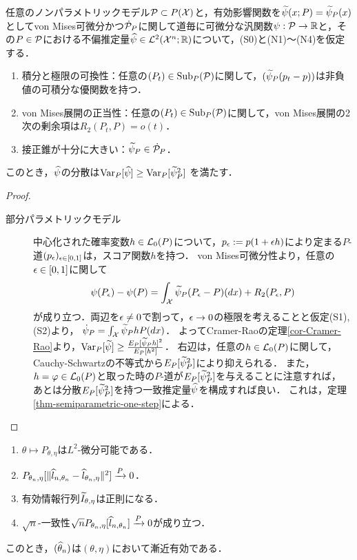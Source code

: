 \documentclass[uplatex, dvipdfmx]{jsarticle}
\newcommand{\Sub}{\mathrm{Sub}}
\begin{document}
\begin{theorem}[ノンパラメトリック一致推定量の最小分散]
    任意のノンパラメトリックモデル$\P\subset P(\X)$と，有効影響関数を$\wt{\psi}(x;P)=\wt{\psi}_P(x)$としてvon Mises可微分かつ$\dot{\P}_P$に関して道毎に可微分な汎関数$\psi:\P\to\R$と，その$P\in\P$における不偏推定量$\wh{\psi}\in\L^2(\X^n;\R)$について，(S0)と(N1)〜(N4)を仮定する．
    \begin{enumerate}[({N}1)]
        \item 積分と極限の可換性：任意の$(P_t)\in\Sub_P(\P)$に関して，$(\wt{\psi}_P(p_t-p))$は非負値の可積分な優関数を持つ．
        \item von Mises展開の正当性：任意の$(P_t)\in\Sub_P(\P)$に関して，von Mises展開の2次の剰余項は$R_2(P_t,P)=o(t)$．
        \item 接正錐が十分に大きい：$\wt{\psi}_P\in\dot{\P}_P$．
    \end{enumerate}
    このとき，$\wh{\psi}$の分散は$\Var_P[\wh{\psi}]\ge\Var_P[\wt{\psi}_P^2]$
    を満たす．
\end{theorem}
\begin{proof}\mbox{}
    \begin{description}
        \item[部分パラメトリックモデル] 中心化された確率変数$h\in\L_0(P)$について，$p_\ep:=p(1+\ep h)$により定まる$P$-道$(p_\ep)_{\ep\in[0,1]}$は，スコア関数$h$を持つ．
        von Mises可微分性より，任意の$\ep\in[0,1]$に関して
        \[\psi(P_\ep)-\psi(P)=\int_\X\wt{\psi}_P(P_\ep-P)(dx)+R_2(P_\ep,P)\]
        が成り立つ．両辺を$\ep\ne0$で割って，$\ep\to0$の極限を考えることと仮定(S1),(S2)より，
        $\dot{\psi}_P=\int_\X\wt{\psi}_P hP(dx)$．
        よってCramer-Raoの定理\ref{cor-Cramer-Rao}より，$\Var_P[\wt{\psi}]\ge\frac{E_P[\wt{\psi}_Ph]^2}{E_P[h^2]}$．
        右辺は，任意の$h\in\L_0(P)$に関して，Cauchy-Schwartzの不等式から$E_P[\wt{\psi}_P^2]$により抑えられる．
        また，$h=\varphi\in\L_0(P)$と取った時の$P$-道が$E_P[\wt{\psi}_P^2]$を与えることに注意すれば，
        あとは分散$E_P[\wt{\psi}_P^2]$を持つ一致推定量$\wh{\psi}$を構成すれば良い．
        これは，定理\ref{thm-semiparametric-one-step}による．
    \end{description}
\end{proof}

\begin{theorem}\mbox{}
    \begin{enumerate}[({S}1)]
        \item $\theta\mapsto P_{\theta,\eta}$は$L^2$-微分可能である．
        \item $P_{\theta_n,\eta}[\norm{\wh{l}_{n,\theta_n}-\wh{l}_{\theta_n,\eta}}^2]\xrightarrow{P}0$．
        \item 有効情報行列$\wt{I}_{\theta,\eta}$は正則になる．
        \item $\sqrt{n}$-一致性$\sqrt{n}P_{\theta_n,\eta}[\wh{l}_{n,\theta_n}]\xrightarrow{P}0$が成り立つ．
    \end{enumerate}
    このとき，$(\wh{\theta}_n)$は$(\theta,\eta)$において漸近有効である．
\end{theorem}
\end{document}
